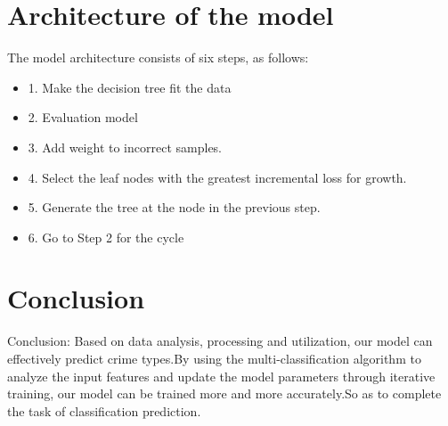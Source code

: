 \documentclass{amsart}
\begin{document}
\newpage

\section{Architecture of the model}

The model architecture consists of six steps, as follows:\\

	\begin{itemize}
	\item 1. Make the decision tree fit the data\\
	\item 2. Evaluation model\\
	\item 3. Add weight to incorrect samples.\\
	\item 4. Select the leaf nodes with the greatest incremental loss for growth.\\
	\item 5. Generate the tree at the node in the previous step.\\
	\item 6. Go to Step 2 for the cycle\\
\end{itemize}

\newpage
\section{Conclusion}

	Conclusion: Based on data analysis, processing and utilization, our model can effectively predict crime types.By using the multi-classification algorithm to analyze the input features and update the model parameters through iterative training, our model can be trained more and more accurately.So as to complete the task of classification prediction.\\
	\\


%
%

\end{document}
